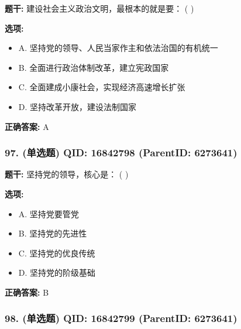 \documentclass[12pt,UTF8]{ctexart}
\begin{document}
\textbf{题干:}
建设社会主义政治文明，最根本的就是要： ( )



\textbf{选项:}
\begin{itemize}[leftmargin=*]

  \item A. 坚持党的领导、人民当家作主和依法治国的有机统一

  \item B. 全面进行政治体制改革，建立宪政国家

  \item C. 全面建成小康社会，实现经济高速增长扩张

  \item D. 坚持改革开放，建设法制国家

\end{itemize}

\textbf{正确答案:}
A

\vspace{0.3em}\hrulefill\vspace{0.7em}

\subsubsection*{97. (单选题) \small QID: 16842798 (ParentID: 6273641)}

\textbf{题干:}
坚持党的领导，核心是： ( )



\textbf{选项:}
\begin{itemize}[leftmargin=*]

  \item A. 坚持党要管党

  \item B. 坚持党的先进性

  \item C. 坚持党的优良传统

  \item D. 坚持党的阶级基础

\end{itemize}

\textbf{正确答案:}
B

\vspace{0.3em}\hrulefill\vspace{0.7em}

\subsubsection*{98. (单选题) \small QID: 16842799 (ParentID: 6273641)}
\end{document}

